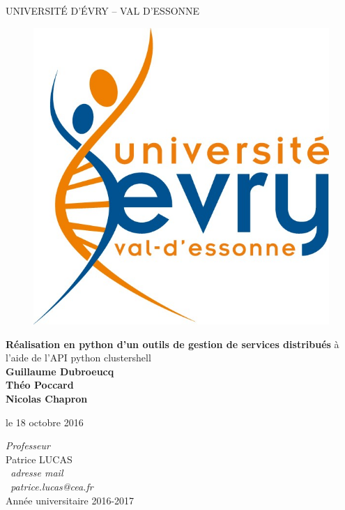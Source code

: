 \documentclass[a4paper,11pt]{article}
\begin{document}
\renewcommand{\refname}{Bibliographie}



\thispagestyle{empty}
\begin{center}
	 {\LARGE UNIVERSITÉ D'ÉVRY -- VAL D'ESSONNE}
	 
\vskip 10mm	 
	 \begin{figure}[H]
		\centerline{\includegraphics[scale=0.4]{LogoUEVE.png}}

	\end{figure}

  \vfill {\huge {\bf Réalisation en python d'un outils de gestion de services distribués}} 
  \vskip 1mm
 à l'aide de l'API python clustershell\\
  
  \vskip 3mm {\LARGE {\bf Guillaume Dubroeucq}} 
  \\ \LARGE {\bf Théo Poccard}
  \\ \LARGE {\bf Nicolas Chapron}
  
  \vskip 3mm le 18 octobre 2016
  \vfill
 
  \emph{Professeur}\\
  Patrice LUCAS\\
  \emph{\ adresse mail}\\
	\emph{\ patrice.lucas@cea.fr}\\
  \vskip 3cm Année universitaire 2016-2017
\end{center}
\end{document}
